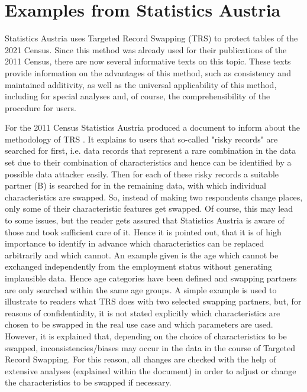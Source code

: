 \section{Examples from Statistics Austria}


Statistics Austria uses Targeted Record Swapping (TRS) to protect tables of the 2021 Census. Since this method was already used for their publications of the 2011 Census, there are now several informative texts on this topic. These texts provide information on the advantages of this method, such as consistency and maintained additivity, as well as the universal applicability of this method, including for special analyses and, of course, the comprehensibility of the procedure for users.

For the 2011 Census Statistics Austria produced a document to inform about the methodology of TRS \cite{StatAT_TRS}. It explains to users that so-called "risky records" are searched for first, i.e. data records that represent a rare combination in the data set due to their combination of characteristics and hence can be identified by a possible data attacker easily. Then for each of these risky records a suitable partner (B) is searched for in the remaining data, with which individual characteristics are swapped. So, instead of making two respondents change places, only some of their characteristic features get swapped. Of course, this may lead to some issues, but the reader gets assured that Statistics Austria is aware of those and took sufficient care of it. Hence it is pointed out, that it is of high importance to identify in advance which characteristics can be replaced arbitrarily and which cannot. An example given is the age which cannot be exchanged independently from the employment status without generating implausible data. Hence age categories have been defined and swapping partners are only searched within the same age groups. A simple example is used to illustrate to readers what TRS does with two selected swapping partners, but, for reasons of confidentiality, it is not stated explicitly which characteristics are chosen to be swapped in the real use case and which parameters are used. However, it is explained that, depending on the choice of characteristics to be swapped, inconsistencies/biases may occur in the data in the course of Targeted Record Swapping. For this reason, all changes are checked with the help of extensive analyses (explained within the document) in order to adjust or change the characteristics to be swapped if necessary.

